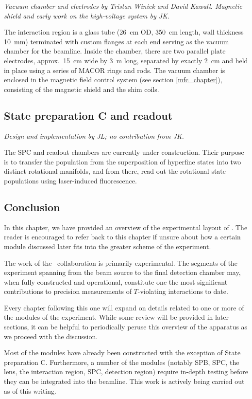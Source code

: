 \textit{Vacuum chamber and electrodes by Tristan Winick and David Kawall.
Magnetic shield and early work on the high-voltage system by JK.}

The interaction region is a glass tube (26~cm OD, 350~cm length, wall thickness
10~mm) terminated with custom flanges at each end serving as the vacuum chamber
for the beamline. Inside the chamber, there are two parallel plate electrodes,
approx.\ 15~cm wide by 3~m long, separated by exactly 2~cm and held in place
using a series of MACOR rings and rods. The vacuum chamber is enclosed in the
magnetic field control system (see section \ref{mfc_chapter}), consisting of the
magnetic shield and the shim coils.

\subsection{State preparation C and readout}

\textit{Design and implementation by JL; no contribution from JK.}

The SPC and readout chambers are currently under construction. Their purpose is
to transfer the population from the superposition of hyperfine states into two
distinct rotational manifolds, and from there, read out the rotational state
populations using laser-induced fluorescence.

\clearpage
\subsection{Conclusion}


In this chapter, we have provided an overview of the experimental layout of
\CENTREX. The reader is encouraged to refer back to this chapter if unsure about
how a certain module discussed later fits into the greater scheme of the
experiment.


The work of the \CENTREX\ collaboration is primarily experimental. The segments
of the experiment spanning from the beam source to the final detection chamber
may, when fully constructed and operational, constitute one the most significant
contributions to precision measurements of $T$-violating interactions to date.


Every chapter following this one will expand on details related to one or more
of the modules of the experiment. While some review will be provided in later
sections, it can be helpful to periodically peruse this overview of the
apparatus as we proceed with the discussion.


Most of the modules have already been constructed with the exception of
State preparation C. Furthermore, a number of the modules (notably SPB, SPC, the
lens, the interaction region, SPC, detection region) require in-depth testing
before they can be integrated into the beamline. This work is actively being
carried out as of this writing.

